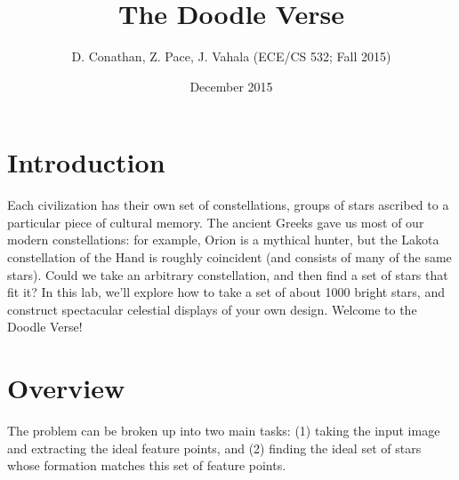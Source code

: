 \documentclass[paper=a4, fontsize=11pt]{scrartcl} %
\title{
\normalfont \normalsize
\huge The Doodle Verse \\ %
}
\author{D. Conathan, Z. Pace, J. Vahala (ECE/CS 532; Fall 2015)}
\date{December 2015}
\begin{document}
\maketitle

\begin{figure}[!h]
\captionsetup{labelformat=empty}
\caption{}
\end{figure}

\section{Introduction}

Each civilization has their own set of constellations, groups of stars ascribed to a particular piece of cultural
memory. The ancient Greeks gave us most of our modern constellations: for example, Orion is a mythical
hunter, but the Lakota constellation of the Hand is roughly coincident (and consists of many of the same
stars). Could we take an arbitrary constellation, and then find a set of stars that fit it? In this lab, we’ll
explore how to take a set of about 1000 bright stars, and construct spectacular celestial displays of your own
design. Welcome to the Doodle Verse!

\section{Overview}

The problem can be broken up into two main tasks: (1) taking the input image and extracting the ideal feature points, and (2) finding the ideal set of stars whose formation matches this set of feature points.
\end{document}
